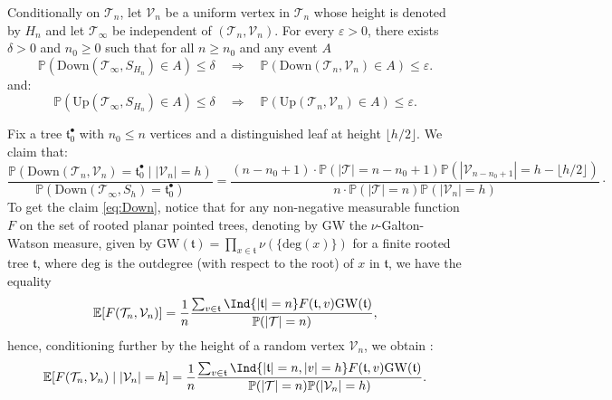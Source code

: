 \begin{lemma} \label{lem:rough} Conditionally on $ \mathcal{T}_n$, let $ \mathcal{V}_n$ be a uniform vertex in $ \mathcal{T}_n$ whose height is denoted by  $H_{n}$ and let $ \mathcal{T}_{\infty}$ be independent of $( \mathcal{T}_{n}, \mathcal{V}_{n})$. %
   For every $ \varepsilon>0$, there exists $\delta >0$ and $n_{0} \geq 0$ such that for all $n \geq n_{0}$ and any event $A$
  $$ \mathbb{P}\left(\mathrm{Down}(  \mathcal{T}_{\infty}, S_{H_{n}}) \in A \right) \leq \delta \quad  \Longrightarrow \quad 
   \mathbb{P}\left(\mathrm{Down}(  \mathcal{T}_{n},  \mathcal{V}_{n}) \in A \right) \leq \varepsilon.$$
and:
$$ \mathbb{P}\left(\mathrm{Up}(\mathcal{T}_{\infty}, S_{H_{n}}) \in A \right) \leq \delta \quad  \Longrightarrow \quad \mathbb{P}\left(\mathrm{Up}(  \mathcal{T}_{n},  \mathcal{V}_{n}) \in A \right) \leq \varepsilon.$$
 \end{lemma}
 \proof Fix a  tree $ \mathfrak{t}_0^{\bullet}$ with $n_{0}\leq n$ vertices and a distinguished leaf at height $\lfloor h/2\rfloor$. 
We claim that: 
\begin{equation}
\label{eq:Down}
\frac{\mathbb{P}(\mathrm{Down}(  \mathcal{T}_{n},  \mathcal{V}_{n})  = \mathfrak{t}_0^{\bullet} \mid | \mathcal{V}_{n}|=h)}{\mathbb{P}(\mathrm{Down}(  \mathcal{T}_{\infty},  S_{h})  = \mathfrak{t}_0^{\bullet})} = \frac{ (n-n_{0}+1) \cdot \mathbb{P}(| \mathcal{T}|=n-n_{0}+1) \mathbb{P}(| \mathcal{V}_{n-n_{0}+1}|=h-\lfloor h/2\rfloor)}{n \cdot \mathbb{P}(| \mathcal{T}|=n) \mathbb{P}(| \mathcal{V}_{n}|=h)}\cdot
\end{equation}
 To get the claim \eqref{eq:Down}, notice that for any non-negative measurable function $F$ on the set of rooted planar pointed trees, denoting by $\mathrm{GW}$ the $\nu$-Galton-Watson measure, given by $\mathrm{GW}(\mathfrak{t}) =\prod_{x \in \mathfrak{t}} \nu(\{\text{deg}(x)\})$ for a finite rooted tree $\mathfrak{t}$, where $\text{deg}$ is the outdegree  (with respect to the root) of $x$ in $\mathfrak{t}$, we have the equality
$$ \mathbb{E}[F(\mathcal{T}_{n},  \mathcal{V}_{n})] = \frac{1}{n} \frac{\sum_{v\in \mathfrak{t}} \Ind{|\mathfrak{t}|=n} F(\mathfrak{t},v) \mathrm{GW}(\mathfrak{t}) }{\mathbb{P}(|\mathcal T|=n)},$$   
 hence, conditioning further by the height of a random vertex $\mathcal{V}_{n}$, we obtain :
$$ \mathbb{E}[F(\mathcal{T}_{n},  \mathcal{V}_{n}) \mid |\mathcal{V}_{n}|=h ] = \frac{1}{n} \frac{\sum_{v\in \mathfrak{t}} \Ind{|\mathfrak{t}|=n, |v|=h} F(\mathfrak{t},v) \mathrm{GW}(\mathfrak{t}) }{\mathbb{P}(|\mathcal T|=n) \mathbb{P}(| \mathcal{V}_{n}|=h) }.$$   
